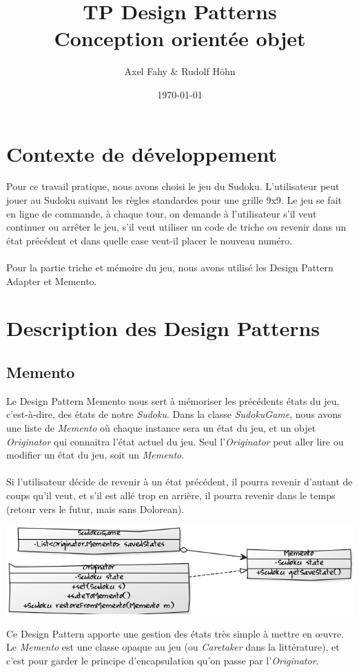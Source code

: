 \documentclass[a4paper]{article}
\title{TP Design Patterns\\Conception orientée objet}
\author{Axel Fahy \& Rudolf Höhn}
\date{\today}
\begin{document}
\maketitle

\section{Contexte de développement}
Pour ce travail pratique, nous avons choisi le jeu du Sudoku.
L'utilisateur peut jouer au Sudoku suivant les règles standardes pour une grille 9x9.
Le jeu se fait en ligne de commande, à chaque tour, on demande à l'utilisateur s'il veut continuer ou arrêter le jeu,
s'il veut utiliser un code de triche ou revenir dans un état précédent et dans quelle case veut-il placer le nouveau numéro.
\\\\
Pour la partie triche et mémoire du jeu, nous avons utilisé les Design Pattern Adapter et Memento.

\section{Description des Design Patterns}

\subsection{Memento}
Le Design Pattern Memento nous sert à mémoriser les précédents états du jeu, c'est-à-dire, des états de notre \textit{Sudoku}.
Dans la classe \textit{SudokuGame}, nous avons une liste de \textit{Memento} où chaque instance sera un état du jeu, et un objet \textit{Originator} qui connaitra l'état actuel du jeu.
Seul l'\textit{Originator} peut aller lire ou modifier un état du jeu, soit un \textit{Memento}.\\\\
Si l'utilisateur décide de revenir à un état précédent, il pourra revenir d'autant de coups qu'il veut, et s'il est allé trop en arrière, il pourra revenir dans le temps (retour vers le futur, mais sans Dolorean).
\begin{center}
\includegraphics[scale=0.7]{../diagrams/memento.png}
\end{center}
Ce Design Pattern apporte une gestion des états très simple à mettre en œuvre.
Le \textit{Memento} est une classe opaque au jeu (ou \textit{Caretaker} dans la littérature), et c'est pour garder le principe d'encapsulation qu'on passe par l'\textit{Originator}.
\newpage
\end{document}
